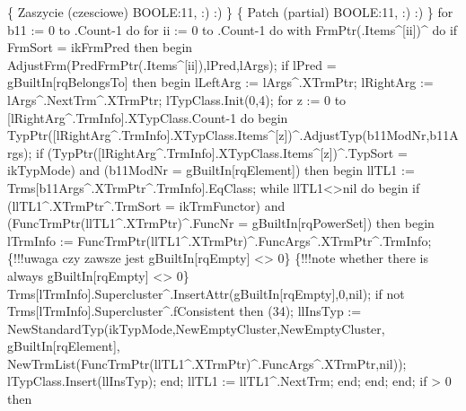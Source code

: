    \{ Zaszycie (czesciowe) BOOLE:11, :) :) \}
   \{ Patch (partial) BOOLE:11, :) :) \}
   for b11 := 0 to .Count-1 do
      for ii := 0 to .Count-1 do
         with FrmPtr(.Items^[ii])^ do
            if FrmSort = ikFrmPred then
            begin
               AdjustFrm(PredFrmPtr(.Items^[ii]),lPred,lArgs);
               if lPred = gBuiltIn[rqBelongsTo] then
               begin
                  lLeftArg := lArgs^.XTrmPtr;
                  lRightArg := lArgs^.NextTrm^.XTrmPtr;
                  lTypClass.Init(0,4);
                  for z := 0 to [lRightArg^.TrmInfo].XTypClass.Count-1 do
                  begin
                     TypPtr([lRightArg^.TrmInfo].XTypClass.Items^[z])^.AdjustTyp(b11ModNr,b11Args);
                     if (TypPtr([lRightArg^.TrmInfo].XTypClass.Items^[z])^.TypSort = ikTypMode)
                        and (b11ModNr = gBuiltIn[rqElement]) then
                     begin
                        llTL1 := Trms[b11Args^.XTrmPtr^.TrmInfo].EqClass;
                        while llTL1<>nil do
                        begin
                           if (llTL1^.XTrmPtr^.TrmSort = ikTrmFunctor) and
                                 (FuncTrmPtr(llTL1^.XTrmPtr)^.FuncNr = gBuiltIn[rqPowerSet]) then
                           begin
                              lTrmInfo := FuncTrmPtr(llTL1^.XTrmPtr)^.FuncArgs^.XTrmPtr^.TrmInfo;
                              \{!!!uwaga czy zawsze jest gBuiltIn[rqEmpty] <> 0\}
                              \{!!!note whether there is always gBuiltIn[rqEmpty] <> 0\}
                              Trms[lTrmInfo].Supercluster^.InsertAttr(gBuiltIn[rqEmpty],0,nil);
                              if not Trms[lTrmInfo].Supercluster^.fConsistent then (34);
                              llInsTyp := NewStandardTyp(ikTypMode,NewEmptyCluster,NewEmptyCluster,
                                                         gBuiltIn[rqElement],
                                                         NewTrmList(FuncTrmPtr(llTL1^.XTrmPtr)^.FuncArgs^.XTrmPtr,nil));
                              lTypClass.Insert(llInsTyp);
                           end;
                           llTL1 := llTL1^.NextTrm;
                        end;
                     end;
                  end;
                  if  > 0 then
